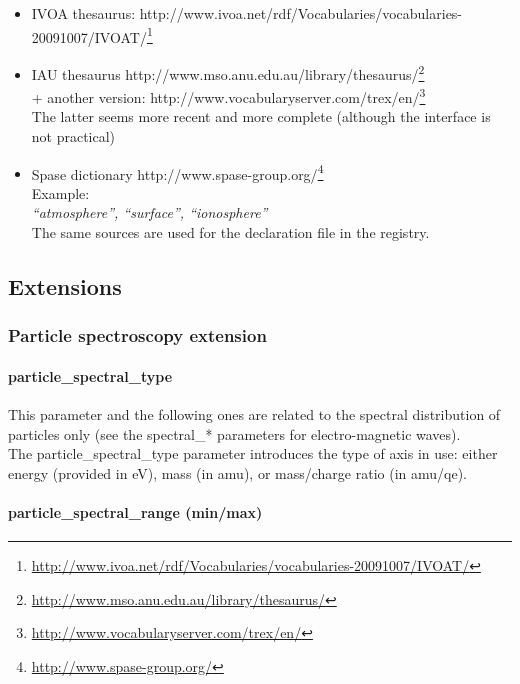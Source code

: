 \documentclass[11pt,a4paper]{ivoa}
\begin{document}
\begin{itemize}
\item IVOA thesaurus: http://www.ivoa.net/rdf/Vocabularies/vocabularies-20091007/IVOAT/\footnote{\url{http://www.ivoa.net/rdf/Vocabularies/vocabularies-20091007/IVOAT/}}
\item IAU thesaurus http://www.mso.anu.edu.au/library/thesaurus/\footnote{\url{http://www.mso.anu.edu.au/library/thesaurus/}}\\ + another version: http://www.vocabularyserver.com/trex/en/\footnote{\url{http://www.vocabularyserver.com/trex/en/}}\\ The latter seems more recent and more complete (although the interface is not practical)
\item Spase dictionary http://www.spase-group.org/\footnote{\url{http://www.spase-group.org/}}\\Example: \\\emph{``atmosphere'', ``surface'', ``ionosphere''}\\ The same sources are used for the declaration file in the registry. 
\end{itemize}

\subsection{Extensions}

\subsubsection{Particle spectroscopy extension}

\paragraph{particle\_spectral\_type}

This parameter and the following ones are related to the spectral distribution of particles only (see the spectral\_* parameters for electro-magnetic waves).\\ The particle\_spectral\_type parameter introduces the type of axis in use: either energy (provided in eV), mass (in amu), or mass/charge ratio (in amu/qe).

\paragraph{particle\_spectral\_range (min/max)}
\end{document}
